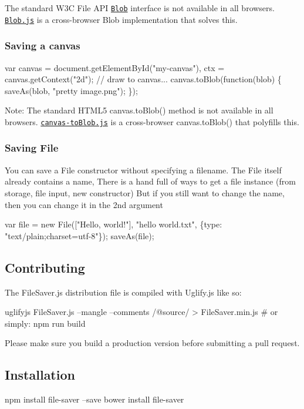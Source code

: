 The standard W3C File A\+PI \href{https://developer.mozilla.org/en-US/docs/DOM/Blob}{\tt {\ttfamily Blob}} interface is not available in all browsers. \href{https://github.com/eligrey/Blob.js}{\tt Blob.\+js} is a cross-\/browser {\ttfamily Blob} implementation that solves this.

\subsubsection*{Saving a canvas}


\begin{DoxyCode}
var canvas = document.getElementById("my-canvas"), ctx = canvas.getContext("2d");
// draw to canvas...
canvas.toBlob(function(blob) \{
    saveAs(blob, "pretty image.png");
\});
\end{DoxyCode}


Note\+: The standard H\+T\+M\+L5 {\ttfamily canvas.\+to\+Blob()} method is not available in all browsers. \href{https://github.com/eligrey/canvas-toBlob.js}{\tt canvas-\/to\+Blob.\+js} is a cross-\/browser {\ttfamily canvas.\+to\+Blob()} that polyfills this.

\subsubsection*{Saving File}

You can save a File constructor without specifying a filename. The File itself already contains a name, There is a hand full of ways to get a file instance (from storage, file input, new constructor) But if you still want to change the name, then you can change it in the 2nd argument


\begin{DoxyCode}
var file = new File(["Hello, world!"], "hello world.txt", \{type: "text/plain;charset=utf-8"\});
saveAs(file);
\end{DoxyCode}




\subsection*{Contributing }

The {\ttfamily File\+Saver.\+js} distribution file is compiled with Uglify.\+js like so\+:


\begin{DoxyCode}
uglifyjs FileSaver.js --mangle --comments /@source/ > FileSaver.min.js
# or simply:
npm run build
\end{DoxyCode}


Please make sure you build a production version before submitting a pull request.

\subsection*{Installation }


\begin{DoxyCode}
npm install file-saver --save
bower install file-saver
\end{DoxyCode}
 
